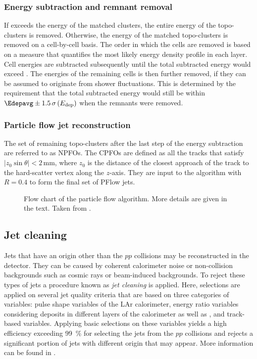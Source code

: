 \subsubsection{Energy subtraction and remnant removal} If \Edepavg exceeds the energy of the matched clusters, the entire energy of the topo-clusters is removed. Otherwise, the energy of the matched topo-clusters is removed on a cell-by-cell basis. The order in which the cells are removed is based on a measure that quantifies the most likely energy density profile in each layer. Cell energies are subtracted subsequently until the total subtracted energy would exceed \Edepavg. The energies of the remaining cells is then further removed, if they can be assumed to originate from shower fluctuations. This is determined by the requirement that the total subtracted energy would still be within $\Edepavg \pm 1.5\,\sigma \left(E_{\text{dep}}\right)$ when the remnants were removed.

\subsubsection{Particle flow jet reconstruction}
The set of remaining topo-clusters after the last step of the energy subtraction are referred to as NPFOs. The CPFOs are defined as all the tracks that satisfy $|z_0 \sin \theta| < 2$\,mm, where $z_0$ is the distance of the closest approach of the track to the hard-scatter vertex along the $z$-axis.
They are input to the \antikt algorithm with $R=0.4$ to form the final set of PFlow jets.

\FloatBarrier
\begin{figure}[t]
    \caption{Flow chart of the particle flow algorithm. More details are given in the text. Taken from .}
    \label{fig:pflow-algorithm}
\end{figure}


\subsection{Jet cleaning}
Jets that have an origin other than the $pp$ collisions may be reconstructed in the detector. They can be caused by coherent calorimeter noise or non-collision backgrounds such as cosmic rays or beam-induced backgrounds. To reject these types of jets a procedure known as \emph{jet cleaning} is applied. Here, selections are applied on several jet quality criteria that are based on three categories of variables: pulse shape variables of the LAr calorimeter, energy ratio variables considering deposits in different layers of the calorimeter as well as \fEM, and track-based variables.
Applying basic selections on these variables yields a high efficiency exceeding \SI{99}{\percent} for selecting the jets from the $pp$ collisions and rejects a significant portion of jets with different origin that may appear. More information can be found in .


